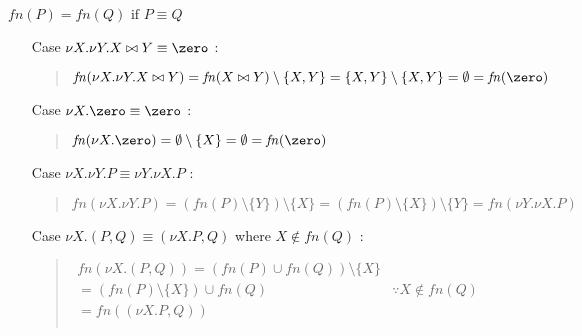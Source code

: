 \begin{frame}[allowframebreaks]{
    $\mathit{fn}(P) = \mathit{fn}(Q) \mbox{ if } P \equiv Q$
  }
\begin{itemize}
\begin{quote}
      Therefore, \\
      \(\begin{array}{l}
      \mathit{fn}(\nu X.(X \bowtie Y, P))
      = (\mathit{fn}(P) \cup \{Y\}) \setminus \{X\} \\
      = ((\mathit{fn}(P) \setminus \{X\}) \cup \{Y\}) \setminus \{X\}
      = \mathit{fn}(P[Y/X]) \setminus \{X\} 
      = \mathit{fn}(\nu X.P[Y/X])
      \end{array}\)
    \end{quote}
  \item[Case] \(\nu X.\nu Y.X \bowtie Y \equiv \zero\) :\\
    \begin{quote}
      \(
      \mathit{fn}(\nu X.\nu Y.X \bowtie Y)
      = \mathit{fn}(X \bowtie Y) \setminus \{X, Y\}
      = \{X, Y\} \setminus \{X, Y\}
      = \emptyset
      = \mathit{fn}(\zero)
      \)
    \end{quote}
  \item[Case] \(\nu X.\zero \equiv \zero\) :\\
    \begin{quote}
      \(
      \mathit{fn}(\nu X.\zero)
      = \emptyset \setminus \{X\}
      = \emptyset
      = \mathit{fn}(\zero)
      \)
    \end{quote}
  \item[Case] \(\nu X.\nu Y.P \equiv \nu Y.\nu X.P\) :\\
    \begin{quote}
      \(
      \mathit{fn}(\nu X.\nu Y.P)
      = (\mathit{fn}(P) \setminus \{Y\}) \setminus \{X\}
      = (\mathit{fn}(P) \setminus \{X\}) \setminus \{Y\}
      = \mathit{fn}(\nu Y.\nu X.P)
      \)
    \end{quote}
  \item[Case] \(\nu X.(P,Q) \equiv (\nu X.P,Q)\)
    where \(X \notin \mathit{fn}(Q)\) :\\
    \begin{quote}
      \(\begin{array}{ll}
      \mathit{fn}(\nu X.(P,Q))
      = (\mathit{fn}(P) \cup \mathit{fn}(Q)) \setminus \{X\} &\\
      = (\mathit{fn}(P) \setminus \{X\}) \cup \mathit{fn}(Q)
      & \because X \notin \mathit{fn}(Q) \\
      = \mathit{fn}((\nu X.P,Q)) &\\
      \end{array}\)
    \end{quote}
  \end{itemize}  
\end{frame}


